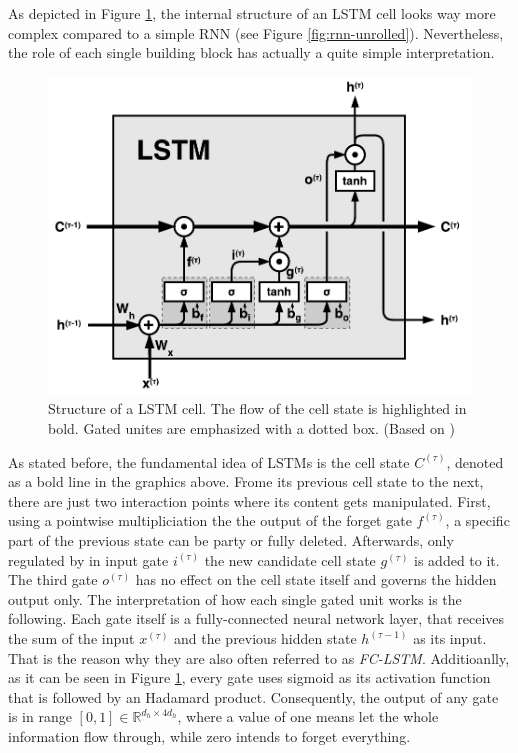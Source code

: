 

As depicted in Figure \ref{fig:lstm}, the internal structure of an LSTM cell looks way more complex compared to a simple RNN (see Figure \ref{fig:rnn-unrolled}). Nevertheless, the role of each single building block has actually a quite simple interpretation.

\begin{figure}[htpb]
	\centering
	\includegraphics[scale=0.8]{figures/lstm.pdf}
	\caption[Structure of a LSLTM cell]{Structure of a LSTM cell. The flow of the cell state is highlighted in bold. Gated unites are emphasized with a dotted box. (Based on \parencite{understand_lstm})} \label{fig:lstm}
\end{figure}

As stated before, the fundamental idea of LSTMs is the cell state $C^{(\tau)}$, denoted as a bold line in the graphics above. Frome its previous cell state to the next, there are just two interaction points where its content gets manipulated. First, using a pointwise multipliciation the the output of the forget gate $f^{(\tau)}$, a specific part of the previous state can be party or fully deleted. Afterwards, only regulated by in input gate $ i^{(\tau)} $ the new candidate cell state $ g^{(\tau)} $ is added to it. The third gate $ o^{(\tau)} $ has no effect on the cell state itself and governs the hidden output only.
The interpretation of how each single gated unit works is the following. Each gate itself is a fully-connected neural network layer, that receives the sum of the input $x^{(\tau)}$ and the previous hidden state $h^{(\tau-1)}$ as its input. That is the reason why they are also often referred to as \textit{FC-LSTM}. Additioanlly, as it can be seen in Figure \ref{fig:lstm}, every gate uses sigmoid as its activation function that is followed by an Hadamard product. Consequently, the output of any gate is in range $ [0, 1] \in \mathbb{R}^{d_h \times 4d_h} $, where a value of one means let the whole information flow through, while zero intends to forget everything. 

